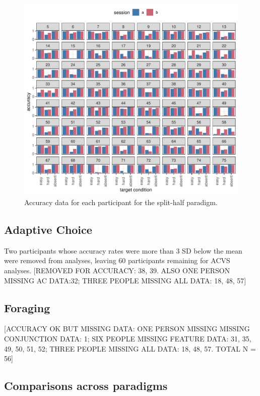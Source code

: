 \documentclass[a4paper, oneside, 11pt, onecolumn]{article}
\begin{document}
\begin{figure}
\centering
\includegraphics[width=14cm]{../Scripts/lineseg/scratch/acc_by_session_by_person.pdf}
\caption{Accuracy data for each participant for the split-half paradigm.}
\label{fig:splithalf_acc_all}
\end{figure}

\subsection{Adaptive Choice}

Two participants whose accuracy rates were more than 3 SD below the mean were removed from analyses, leaving 60 participants remaining for ACVS analyses. [REMOVED FOR ACCURACY: 38, 39. ALSO ONE PERSON MISSING AC DATA:32; THREE PEOPLE MISSING ALL DATA: 18, 48, 57]

\subsection{Foraging}

[ACCURACY OK BUT MISSING DATA: ONE PERSON MISSING MISSING CONJUNCTION DATA: 1; SIX PEOPLE MISSING FEATURE DATA: 31, 35, 49, 50, 51, 52; THREE PEOPLE MISSING ALL DATA: 18, 48, 57. TOTAL N = 56]

\subsection{Comparisons across paradigms}
\end{document}
